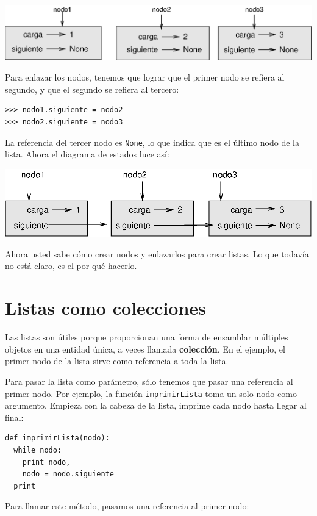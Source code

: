 \beforefig
\centerline{\includegraphics[scale=0.7]{illustrations/link1.eps}}
\afterfig

Para enlazar los nodos, tenemos que lograr que el primer nodo
se refiera al segundo, y que el segundo se refiera al tercero:

\beforeverb
\begin{verbatim}
>>> nodo1.siguiente = nodo2
>>> nodo2.siguiente = nodo3
\end{verbatim}
\afterverb
%
La referencia del tercer nodo es \texttt{None}, lo que indica que
es el último nodo de la lista. Ahora el diagrama de estados luce
así:

\beforefig
\centerline{\includegraphics[scale=0.9]{illustrations/link2.eps}}
\afterfig

Ahora usted sabe cómo crear nodos y enlazarlos para crear listas.
Lo que todavía no está claro, es el por qué hacerlo.


\section{Listas como colecciones}

Las listas son útiles porque proporcionan una forma de ensamblar
múltiples objetos en una entidad única, a veces llamada {\bf colección}.  En el
ejemplo, el primer nodo de la lista sirve como referencia a toda la lista.


Para pasar la lista como parámetro, sólo tenemos que pasar una referencia
al primer nodo. Por ejemplo, la función  \texttt{imprimirLista} toma un
solo nodo como argumento. Empieza con la cabeza de la lista, imprime cada
nodo hasta llegar al final:

\beforeverb
\begin{verbatim}
def imprimirLista(nodo):
  while nodo:
    print nodo,
    nodo = nodo.siguiente
  print
\end{verbatim}
\afterverb
%
Para llamar este método, pasamos una referencia al primer nodo:


